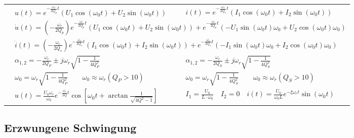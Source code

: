 \begin{tabular}{| p{4cm} | p{7cm} | p{7cm} |}
	  & $u(t) = e^{-\frac{\omega_r}{2Q_p}t}(U_1\cos(\omega_0 t)+U_2\sin(\omega_0
	  t))$
	  & $i(t) = e^{-\frac{\omega_r}{2Q_s}t}(I_1\cos(\omega_0 t)+I_2\sin(\omega_0
	  t))$\\
	  &
	  \multicolumn{2}{|l|}{
	  $\dot{u}(t)=\left(-\frac{\omega_r}{2Q_p}\right)e^{-\frac{\omega_r}{2Q_p}t}\left(U_1\cos(\omega_0
	  t)+U_2\sin(\omega_0
	  t)\right)+e^{-\frac{\omega_r}{2Q_p}t}\left(-U_1\sin(\omega_0 t)\omega_0 +
	  U_2\cos(\omega_0 t)\omega_0\right)$ }\\
	  &
	  \multicolumn{2}{|l|}{
	  $\dot{i}(t)=\left(-\frac{\omega_r}{2Q_s}\right)e^{-\frac{\omega_r}{2Q_s}t}\left(I_1\cos(\omega_0
	  t)+I_2\sin(\omega_0
	  t)\right)+e^{-\frac{\omega_r}{2Q_s}t}\left(-I_1\sin(\omega_0 t)\omega_0 +
	  I_2\cos(\omega_0 t)\omega_0\right)$ }\\
		& $\alpha_{1,2} = - \frac{\omega_r}{2 Q_P} \pm j \omega_r \sqrt{1 - \frac{1}{4 Q_P^2}}$	
		& $\alpha_{1,2} = - \frac{\omega_r}{2 Q_S} \pm j \omega_r \sqrt{1 - \frac{1}{4 Q_S^2}}$	\\
		& $\omega_0 = \omega_r \sqrt{1 - \frac{1}{4 Q_P^2}} \qquad \omega_0 \approx \omega_r (Q_P > 10)$ 
		& $\omega_0 = \omega_r \sqrt{1 - \frac{1}{4 Q_S^2}} \qquad \omega_0 \approx\omega_r (Q_S > 10)$\\
		& $u(t) = \frac{U_0 \omega_r}{\omega_0} e^{- \frac{\omega_r}{2
					Q} t} \cos{[\omega_0 t + \arctan{\frac{1}{\sqrt{4 Q^2 -1}}}]}$
		& $I_1 =  \frac{U_0}{L \cdot \omega_0} \quad I_2 = 0
		 \quad i(t) = \frac{U_0}{\omega_0 L} e^{-\xi  \omega_r  t} \sin{(\omega_0 t)}$
		\\
	\hline
	\end{tabular}
	
\renewcommand{\arraystretch}{\arraystretchOriginal}


\subsection{Erzwungene Schwingung}	

